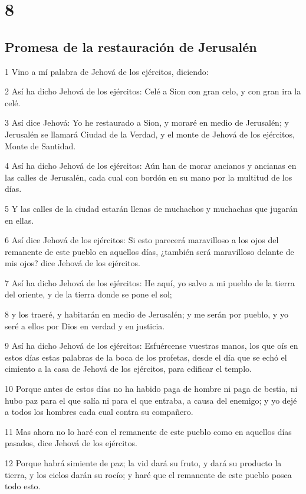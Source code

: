 \chapter{8}

\section*{Promesa de la restauración de Jerusalén}

\par 1 Vino a mí palabra de Jehová de los ejércitos, diciendo:
\par 2 Así ha dicho Jehová de los ejércitos: Celé a Sion con gran celo, y con gran ira la celé.
\par 3 Así dice Jehová: Yo he restaurado a Sion, y moraré en medio de Jerusalén; y Jerusalén se llamará Ciudad de la Verdad, y el monte de Jehová de los ejércitos, Monte de Santidad.
\par 4 Así ha dicho Jehová de los ejércitos: Aún han de morar ancianos y ancianas en las calles de Jerusalén, cada cual con bordón en su mano por la multitud de los días.
\par 5 Y las calles de la ciudad estarán llenas de muchachos y muchachas que jugarán en ellas.
\par 6 Así dice Jehová de los ejércitos: Si esto parecerá maravilloso a los ojos del remanente de este pueblo en aquellos días, ¿también será maravilloso delante de mis ojos? dice Jehová de los ejércitos.
\par 7 Así ha dicho Jehová de los ejércitos: He aquí, yo salvo a mi pueblo de la tierra del oriente, y de la tierra donde se pone el sol;
\par 8 y los traeré, y habitarán en medio de Jerusalén; y me serán por pueblo, y yo seré a ellos por Dios en verdad y en justicia.
\par 9 Así ha dicho Jehová de los ejércitos: Esfuércense vuestras manos, los que oís en estos días estas palabras de la boca de los profetas, desde el día que se echó el cimiento a la casa de Jehová de los ejércitos, para edificar el templo.
\par 10 Porque antes de estos días no ha habido paga de hombre ni paga de bestia, ni hubo paz para el que salía ni para el que entraba, a causa del enemigo; y yo dejé a todos los hombres cada cual contra su compañero.
\par 11 Mas ahora no lo haré con el remanente de este pueblo como en aquellos días pasados, dice Jehová de los ejércitos.
\par 12 Porque habrá simiente de paz; la vid dará su fruto, y dará su producto la tierra, y los cielos darán su rocío; y haré que el remanente de este pueblo posea todo esto.
